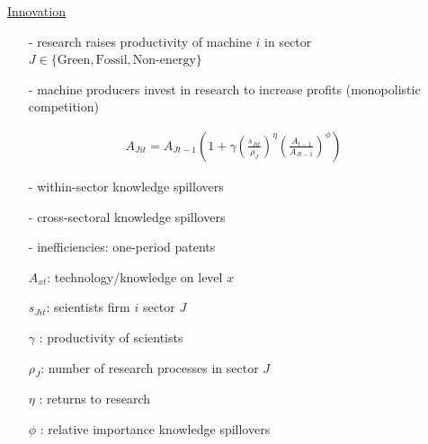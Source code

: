 \documentclass[11pt,aspectratio=169]{beamer}
\begin{document}
\addtocounter{framenumber}{-1}
\begin{frame}{\hyperlink{modma}{Innovation}}
	\vspace{-2mm}
	\begin{itemize}
		\item[-] research raises productivity of machine $i$ in sector $J\in\{\text{Green},\text{Fossil},\text{Non-energy}\}$ \vspace{-1mm}
		\item[-] machine producers invest in research to increase profits \small{(monopolistic competition)}
		\vspace{-1mm}
		\normalsize
	\end{itemize}
	\vspace{-1.4mm}
	\large
	\begin{align*}
		A_{Jit}={A_{Jt-1}}\left(1+\gamma{\left(\frac{s_{Jit}}{\rho_J}\right)^{\eta}}\left(\frac{A_{t-1}}{A_{Jt-1}}\right)^\phi\right)
	\end{align*}
	\normalsize
	\vspace{-1.9mm}
	\begin{enumerate}
		\item[-] within-sector knowledge spillovers \vspace{-1mm}
		\item[-]  {cross-sectoral knowledge spillovers} \vspace{-1mm}
		\item[-] \alert{inefficiencies: one-period patents}
	\end{enumerate}
	\small
	\vspace{4mm}
	\hspace{-2mm}
\begin{minipage}[t!]{0.46\textwidth}
	\vspace{0mm}
	\begin{itemize}
		\item[] $A_{xt}$: technology/knowledge on level $x$
		\vspace{-7mm}		
		\item[] $s_{Jit}$: scientists firm $i$ sector $J$
		\vspace{-2mm}
		\item[] $\gamma$ : productivity of scientists
	\end{itemize}
\end{minipage}
\hspace{-5mm}
\vspace{-5mm}
\begin{minipage}[t!]{0.54\textwidth}
	\vspace{0mm}
	\begin{itemize}	
		\item[] {$\rho_J$: number of research processes in sector $J$}
		\vspace{-2mm}			
		\item[] $\eta$ : returns to research
		\vspace{-2mm}			
		\item[] $\phi$ : relative importance knowledge spillovers
	\end{itemize}
\end{minipage}
\end{frame}
\end{document}

